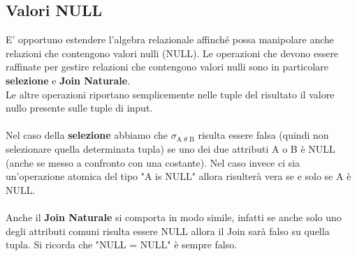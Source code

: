 \documentclass{report}
\begin{document}
\subsection{Valori NULL}
E’ opportuno estendere l’algebra relazionale affinché possa manipolare anche relazioni che contengono valori nulli (NULL). Le operazioni che devono essere raffinate per gestire relazioni che contengono valori nulli sono in particolare \textbf{selezione} e \textbf{Join Naturale}.\\
Le altre operazioni riportano semplicemente nelle tuple del risultato il valore nullo presente sulle tuple di input.\\\\
Nel caso della \textbf{selezione} abbiamo che $\sigma_\text{A $\theta$ B}$ risulta essere falsa (quindi non selezionare quella determinata tupla) se uno dei due attributi A o B è NULL (anche se messo a confronto con una costante). Nel caso invece ci sia un'operazione atomica del tipo "A is NULL" allora risulterà vera se e solo se A è NULL.\\\\
Anche il \textbf{Join Naturale} si comporta in modo simile, infatti se anche solo uno degli attributi comuni risulta essere NULL allora il Join sarà falso su quella tupla. Si ricorda che "NULL = NULL" è sempre falso.\\
\end{document}
